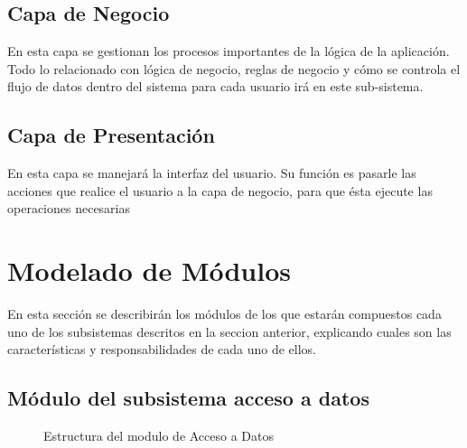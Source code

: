     \subsection{Capa de Negocio}
    En esta capa se gestionan los procesos importantes de la lógica de la aplicación. Todo lo relacionado con lógica de negocio, reglas de negocio y cómo se controla el flujo de datos dentro del sistema para cada usuario irá en este sub-sistema.
    
    \subsection{Capa de Presentación}
    En esta capa se manejará la interfaz del usuario. Su función es pasarle las acciones que realice el usuario a la capa de negocio, para que ésta ejecute las operaciones necesarias

\section{Modelado de Módulos}	

    En esta sección se describirán los módulos de los que estarán compuestos cada uno de los subsistemas descritos en la seccion anterior, explicando cuales son las características y responsabilidades de cada uno de ellos. 
    
    
    \subsection{Módulo del subsistema acceso a datos}
    \begin{figure}[htbp!]
    	\begin{center}
    		\caption{Estructura del modulo de Acceso a Datos}
    		\label{fig:packagedatos}
    	\end{center}
    \end{figure}
        
